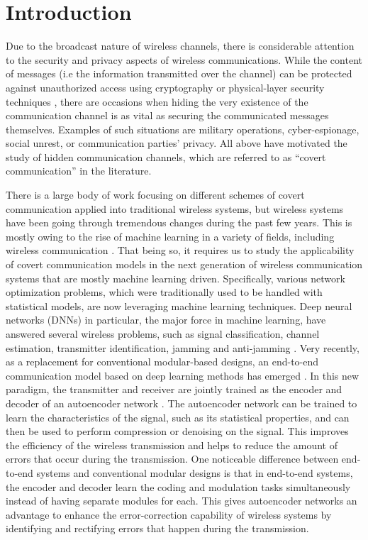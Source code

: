\section{Introduction}
\label{s:intro}
Due to the broadcast nature of wireless channels, there is considerable attention to the security and privacy aspects of wireless communications. While the content of messages (i.e the information transmitted over the channel) can be protected against unauthorized access using cryptography or physical-layer security techniques \cite{zhou2013physical}, there are occasions when hiding the very existence of the communication channel is as vital as securing the communicated messages themselves. Examples of such situations are military operations, cyber-espionage, social unrest, or communication parties' privacy. All above have motivated the study of hidden communication channels, which are referred to as ``covert communication'' \cite{lampson1973note} in the literature.

There is a large body of work focusing on different schemes of covert communication applied into traditional wireless systems, but wireless systems have been going through tremendous changes during the past few years. This is mostly owing to the rise of machine learning in a variety of fields, including wireless communication \cite{wang2017deep}. That being so, it requires us to study the applicability of covert communication models in the next generation of wireless communication systems that are mostly machine learning driven. Specifically, various network optimization problems, which were traditionally used to be handled with statistical models, are now leveraging machine learning techniques. Deep neural networks (DNNs) in particular, the major force in machine learning, have answered several wireless problems, such as signal classification, channel estimation, transmitter identification, jamming and anti-jamming \cite{bahramali2021robust}. Very recently, as a replacement for conventional modular-based designs, an end-to-end communication model based on deep learning methods has emerged \cite{o2017introduction}. In this new paradigm, the transmitter and receiver are jointly trained as the encoder and decoder of an autoencoder network \cite{baldi2012autoencoders}. The autoencoder network can be trained to learn the characteristics of the signal, such as its statistical properties, and can then be used to perform compression or denoising on the signal. This improves the efficiency of the wireless transmission and helps to reduce the amount of errors that occur during the transmission. One noticeable difference between end-to-end systems and conventional modular designs is that in end-to-end systems, the encoder and decoder learn the coding and modulation tasks simultaneously instead of having separate modules for each. This gives autoencoder networks an advantage to enhance the error-correction capability of wireless systems by identifying and rectifying errors that happen during the transmission.

